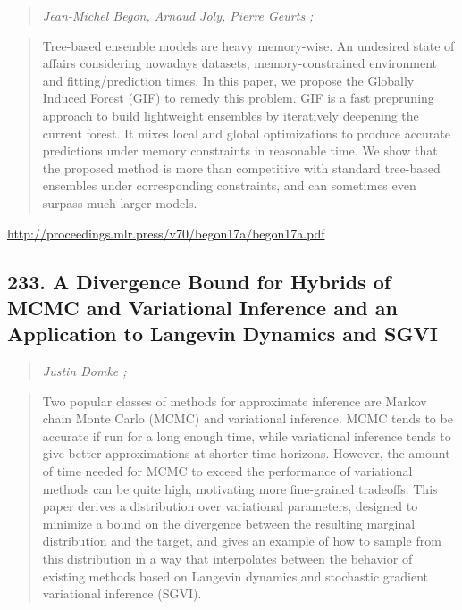 \documentclass{article}
\begin{document}
\begin{quote}
\footnotesize{\textit{Jean-Michel Begon, Arnaud Joly, Pierre Geurts ;}}
\end{quote}

\begin{quote}
    Tree-based ensemble models are heavy memory-wise. An undesired state of affairs considering nowadays datasets, memory-constrained environment and fitting/prediction times. In this paper, we propose the Globally Induced Forest (GIF) to remedy this problem. GIF is a fast prepruning approach to build lightweight ensembles by iteratively deepening the current forest. It mixes local and global optimizations to produce accurate predictions under memory constraints in reasonable time. We show that the proposed method is more than competitive with standard tree-based ensembles under corresponding constraints, and can sometimes even surpass much larger models.  \end{quote}

\href{http://proceedings.mlr.press/v70/begon17a/begon17a.pdf}{http://proceedings.mlr.press/v70/begon17a/begon17a.pdf}

\subsection{233. A Divergence Bound for Hybrids of MCMC and Variational Inference and an Application to Langevin Dynamics and SGVI}

\begin{quote}
\footnotesize{\textit{Justin Domke ;}}
\end{quote}

\begin{quote}
    Two popular classes of methods for approximate inference are Markov chain Monte Carlo (MCMC) and variational inference. MCMC tends to be accurate if run for a long enough time, while variational inference tends to give better approximations at shorter time horizons. However, the amount of time needed for MCMC to exceed the performance of variational methods can be quite high, motivating more fine-grained tradeoffs. This paper derives a distribution over variational parameters, designed to minimize a bound on the divergence between the resulting marginal distribution and the target, and gives an example of how to sample from this distribution in a way that interpolates between the behavior of existing methods based on Langevin dynamics and stochastic gradient variational inference (SGVI).  \end{quote}
\end{document}
